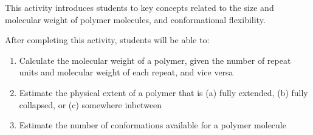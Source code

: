 %
%
%
%

\renewcommand{\figpath}{content/intro/size-and-complexity/figs}
\renewcommand{\labelbase}{size-and-complexity}

\begin{activity}

\begin{instructornotes}

	This activity introduces students to key concepts related to the size and molecular weight of polymer molecules, and conformational flexibility.
	
	After completing this activity, students will be able to:
			\begin{enumerate}
				\item Calculate the molecular weight of a polymer, given the number of repeat units and molecular weight of each repeat, and vice versa
				\item Estimate the physical extent of a polymer that is (a) fully extended, (b) fully collapsed, or (c) somewhere inbetween
				\item Estimate the number of conformations available for a polymer molecule
			\end{enumerate}
			

\end{instructornotes}
\end{activity}
